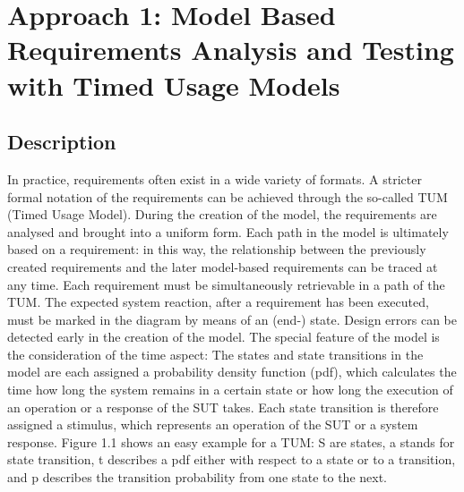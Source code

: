 \section{Approach 1: Model Based Requirements Analysis and Testing with Timed
Usage Models\label{sec:Approach-1}}

\subsection{Description}

In practice, requirements often exist in a wide variety of formats.
A stricter formal notation of the requirements can be achieved through
the so-called TUM (Timed Usage Model). During the creation of the
model, the requirements are analysed and brought into a uniform form.
Each path in the model is ultimately based on a requirement: in this
way, the relationship between the previously created requirements
and the later model-based requirements can be traced at any time.
Each requirement must be simultaneously retrievable in a \textquotedbl path\textquotedbl{}
of the TUM. The expected system reaction, after a requirement has
been executed, must be marked in the diagram by means of an (end-)
state. \textquotedbl Design\textquotedbl{} errors can be detected early
in the creation of the model. The special feature of the model is
the consideration of the time aspect: The states and state transitions
in the model are each assigned a probability density function (pdf),
which calculates the time how long the system remains in a certain
state or how long the execution of an operation or a response of the
SUT takes. Each state transition is therefore assigned a stimulus,
which represents an operation of the SUT or a system response. Figure
1.1 shows an easy example for a TUM: \textquotedbl S\textquotedbl{}
are states, \textquotedbl a\textquotedbl{} stands for state transition,
\textquotedbl t\textquotedbl{} describes a pdf either with respect
to a state or to a transition, and \textquotedbl p\textquotedbl{} describes
the transition probability from one state to the next.

